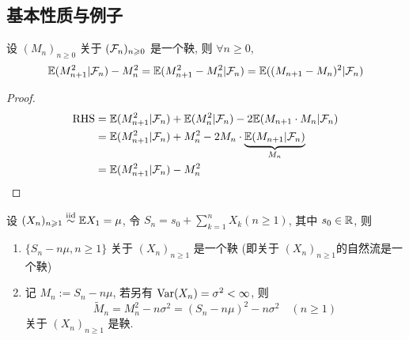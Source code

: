 \subsection{基本性质与例子}

\begin{property}\label{prt:p142-prt1}
设 $(M_n)_{n\geq 0}$ 关于 $(\mathcal{F}_n)_{n\geqslant 0}$ 是一个鞅, 则 $\forall n\geq 0$,
\[
\mathbb E(M_{n+1}^2|\mathcal{F}_n)-M_n^2=\mathbb E(M_{n+1}^2-M_n^2|\mathcal{F}_n)=\mathbb E((M_{n+1}-M_n)^2|\mathcal{F}_n)
\]
\end{property}

\begin{proof}
    \[
    \begin{aligned}
        \operatorname{RHS} &= \mathbb E(M_{n+1}^2|\mathcal{F}_n)+\mathbb E(M_n^2|\mathcal{F}_n)-2\mathbb E(M_{n+1}\cdot M_n|\mathcal{F}_n)\\
        &=\mathbb E(M_{n+1}^2|\mathcal{F}_n)+M_n^2-2M_n\cdot \underbrace{\mathbb E(M_{n+1}|\mathcal{F}_n)}_{M_n}\\
        &=\mathbb E(M_{n+1}^2|\mathcal{F}_n)-M_n^2
    \end{aligned}
    \]
\end{proof}

\begin{example}\label{exa:p142-exa5.2}
    设 $(X_n)_{n\geqslant 1}\overset{\text{iid}}{\sim}\mathbb E X_1=\mu$, 令 $S_n=s_0+\sum_{k=1}^n X_k(n\geq 1)$, 其中 $s_0\in \mathbb{R}$, 则
    \begin{enumerate}
        \item $\{S_n-n\mu,n\geq 1\}$ 关于 $(X_n)_{n\geq 1}$ 是一个鞅 (即关于 $(X_n)_{n\geq 1}$的自然流是一个鞅)
        \item 记 $M_n:=S_n-n\mu$, 若另有 $\operatorname{Var}(X_n)=\sigma^2<\infty$, 则
        \[
        \tilde{M}_n=M_n^2-n\sigma^2=(S_n-n\mu)^2-n\sigma^2\quad (n\geq 1)
        \]
        关于 $(X_n)_{n\geq 1}$ 是鞅.
    \end{enumerate}
\end{example}

